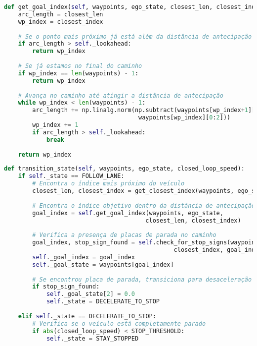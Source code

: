 \documentclass[
	12pt,				%
	oneside, %
	a4paper,			%
	english,			%
	french,				%
	spanish,			%
	brazil				%
	]{abntex2}
\begin{document}
\begin{apendicesenv}
\begin{lstlisting}[language=Python, caption=Implementação da função para determinação do \textit{waypoint} objetivo., label=lst:get_goal_index_implementation]
def get_goal_index(self, waypoints, ego_state, closest_len, closest_index):
    arc_length = closest_len
    wp_index = closest_index
    
    # Se o ponto mais próximo já está além da distância de antecipação
    if arc_length > self._lookahead:
        return wp_index
    
    # Se já estamos no final do caminho
    if wp_index == len(waypoints) - 1:
        return wp_index
    
    # Avança no caminho até atingir a distância de antecipação
    while wp_index < len(waypoints) - 1:
        arc_length += np.linalg.norm(np.subtract(waypoints[wp_index+1][0:2],
                                      waypoints[wp_index][0:2]))
        wp_index += 1
        if arc_length > self._lookahead:
            break
    
    return wp_index
\end{lstlisting}

\begin{lstlisting}[language=Python, caption=Implementação parcial da função de transição de estados., label=lst:transition_state_implementation]
def transition_state(self, waypoints, ego_state, closed_loop_speed):
    if self._state == FOLLOW_LANE:
        # Encontra o índice mais próximo do veículo
        closest_len, closest_index = get_closest_index(waypoints, ego_state)
        
        # Encontra o índice objetivo dentro da distância de antecipação
        goal_index = self.get_goal_index(waypoints, ego_state,
                                        closest_len, closest_index)
        
        # Verifica a presença de placas de parada no caminho
        goal_index, stop_sign_found = self.check_for_stop_signs(waypoints,
                                                closest_index, goal_index)
        self._goal_index = goal_index
        self._goal_state = waypoints[goal_index]
        
        # Se encontrou placa de parada, transiciona para desaceleração
        if stop_sign_found:
            self._goal_state[2] = 0.0
            self._state = DECELERATE_TO_STOP
            
    elif self._state == DECELERATE_TO_STOP:
        # Verifica se o veículo está completamente parado
        if abs(closed_loop_speed) < STOP_THRESHOLD:
            self._state = STAY_STOPPED
            

\end{lstlisting}
\end{apendicesenv}
\end{document}
